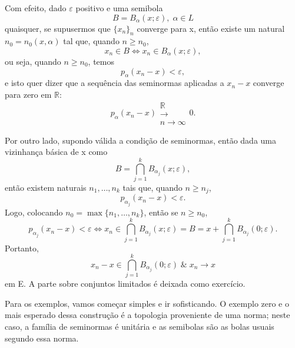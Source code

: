 \documentclass[../distribution_theory_notes.tex]{subfiles}
\begin{document}
    \begin{proof*}
       Com efeito, dado \(\varepsilon \) positivo e uma semibola 
         \[
           B = B_{\alpha }(x; \varepsilon ),\; \alpha \in L
         \]
         quaisquer, se supusermos que \(\{x_{n}\}_{n}\) converge para x, então existe um natural \(n_{0}=n_{0}(x, \alpha )\) tal que, quando \(n\geq n_{0}\), 
           \[
             x_{n}\in B \Longleftrightarrow x_{n}\in B_{\alpha }(x; \varepsilon ),
           \]
           ou seja, quando \(n\geq n_{0}\), temos 
             \[
               p_{\alpha }(x_{n}-x)<\varepsilon ,
             \]
             e isto quer dizer que a sequência das seminormas aplicadas a \(x_{n}-x\) converge para zero em \(\mathbb{R}:\)
               \[
                 p_{\alpha }(x_{n}-x)\substack{\mathbb{R} \\ \rightarrow \\ n\to \infty}0.
               \]

               Por outro lado, supondo válida a condição de seminormas, então dada uma vizinhança básica de x como 
                 \[
                   B = \bigcap_{j=1}^{k}B_{\alpha_{j}}(x; \varepsilon ),
                 \]
                 então existem naturais \(n_{1},\dotsc , n_{k}\) tais que, quando \(n\geq n_{j}\), 
                   \[
                     p_{\alpha_{j}}(x_{n}-x)<\varepsilon .
                   \]
                   Logo, colocando \(n_{0}=\max\{n_1, \dotsc , n_{k}\}\), então se \(n\geq n_{0}\), 
                     \[
                       p_{\alpha_{j}}(x_{n}-x)<\varepsilon \Longleftrightarrow x_{n}\in \bigcap_{j=1}^{k}B_{\alpha_{j}}(x; \varepsilon ) = B = x+\bigcap_{j=1}^{k}B_{\alpha_{j}}(0; \varepsilon ).
                     \]
                     Portanto,
                       \[
                         x_{n}-x\in \bigcap_{j=1}^{k}B_{\alpha_{j}}(0;\varepsilon ) \;\&\; x_{n}\rightarrow x 
                       \]
                       em E. A parte sobre conjuntos limitados é deixada como exercício. \qedsymbol
    \end{proof*}
    Para os exemplos, vamos começar simples e ir sofisticando. O exemplo zero e o mais esperado dessa construção é a topologia proveniente de uma norma; neste caso, a família de seminormas é unitária e as semibolas são as bolas usuais segundo essa norma. 
\end{document}
